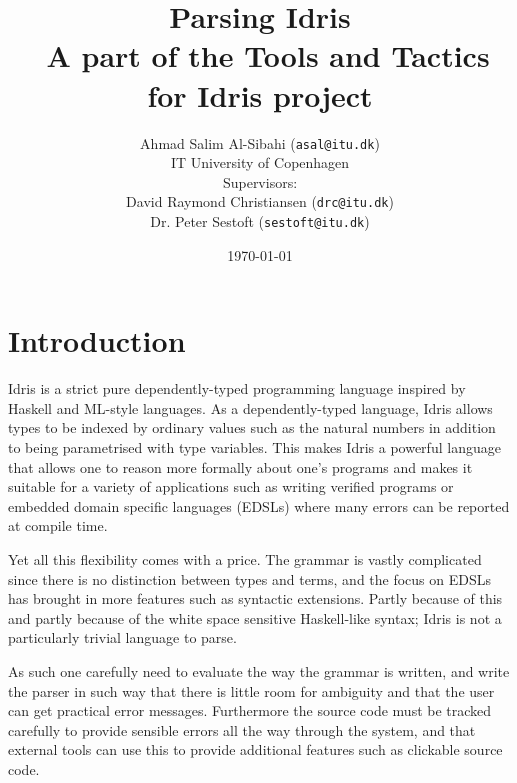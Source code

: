 \documentclass[a4paper]{article}%
\begin{document}
\title{Parsing Idris \\ \normalsize{A part of the Tools and Tactics for Idris project}}
\author{Ahmad Salim Al-Sibahi (\texttt{asal@itu.dk}) \\IT University of Copenhagen\\Supervisors: \\David Raymond Christiansen (\texttt{drc@itu.dk})\\ Dr. Peter Sestoft (\texttt{sestoft@itu.dk})}
\date{\today}


\maketitle
\lstset{basicstyle=\scriptsize\unicodemonofamily, captionpos=b, extendedchars=false, numbers=left, stepnumber=3, firstnumber=1, language=Haskell}



\section{Introduction}
\label{sec:Introduction}

Idris\cite{brady2013idris} is a strict pure dependently-typed programming language inspired by Haskell\cite{marlow2010haskell} and ML-style languages\cite{milner1997definition}.
As a dependently-typed language, Idris allows types to be indexed by ordinary values such as the natural numbers
in addition to being parametrised with type variables.
This makes Idris a powerful language that allows one to reason more formally about one's programs and makes it suitable for a variety of applications
such as writing verified programs or embedded domain specific languages (EDSLs) where many errors can be reported at compile time.

Yet all this flexibility comes with a price.
The grammar is vastly complicated since there is no distinction between types and terms, and the focus on EDSLs has brought in more features such as syntactic extensions.
Partly because of this and partly because of the white space sensitive Haskell-like syntax; Idris is not a particularly trivial language to parse.

As such one carefully need to evaluate the way the grammar is written, and write the parser in such way that there is little room for ambiguity and that the user can get practical error messages.
Furthermore the source code must be tracked carefully to provide sensible errors all the way through the system, and that external tools can use this to provide additional features such as clickable source code.
\end{document}
